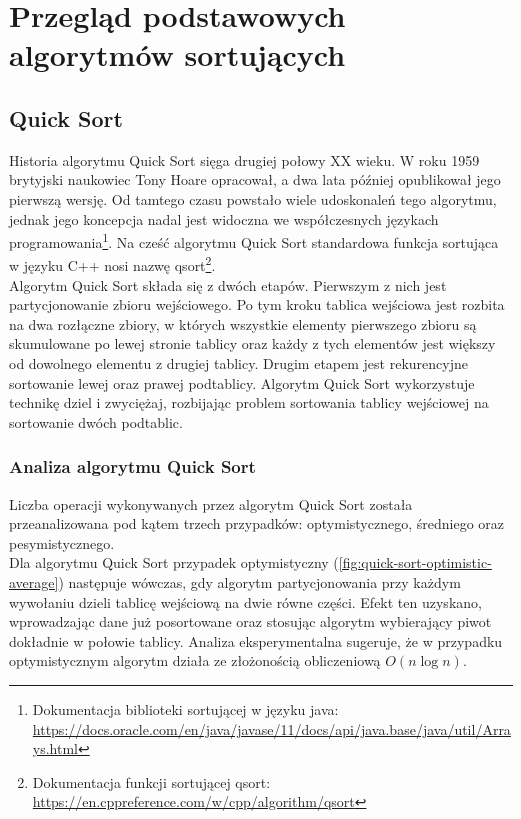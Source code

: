 \chapter{Przegląd podstawowych algorytmów sortujących}
\thispagestyle{chapterBeginStyle}


\section{Quick Sort}


Historia algorytmu Quick Sort sięga drugiej połowy XX wieku. W roku 1959 brytyjski naukowiec Tony Hoare
opracował, a dwa lata później opublikował jego pierwszą wersję. Od tamtego czasu powstało wiele
udoskonaleń tego algorytmu, jednak jego koncepcja nadal jest widoczna we współczesnych językach programowania\footnote{Dokumentacja biblioteki sortującej w języku java: \url{https://docs.oracle.com/en/java/javase/11/docs/api/java.base/java/util/Arrays.html}}.
Na cześć algorytmu Quick Sort standardowa funkcja sortująca w języku C++ nosi nazwę qsort\footnote{Dokumentacja funkcji sortującej qsort:
\url{https://en.cppreference.com/w/cpp/algorithm/qsort}}.\\

Algorytm Quick Sort składa się z dwóch etapów. Pierwszym z nich jest partycjonowanie zbioru wejściowego.
Po tym kroku tablica wejściowa jest rozbita na dwa rozłączne zbiory, w których wszystkie elementy pierwszego
zbioru są skumulowane po lewej stronie tablicy oraz każdy z tych elementów jest większy od dowolnego elementu
z drugiej tablicy. Drugim etapem jest rekurencyjne sortowanie lewej oraz prawej podtablicy.
Algorytm Quick Sort wykorzystuje technikę dziel i zwyciężaj, rozbijając problem sortowania tablicy wejściowej na sortowanie dwóch podtablic.


\subsection{Analiza algorytmu Quick Sort}

Liczba operacji wykonywanych przez algorytm Quick Sort została przeanalizowana pod kątem trzech przypadków:
optymistycznego, średniego oraz pesymistycznego.\\

Dla algorytmu Quick Sort przypadek optymistyczny (\ref{fig:quick-sort-optimistic-average}) następuje wówczas, gdy algorytm partycjonowania przy każdym wywołaniu dzieli tablicę wejściową na dwie równe części. Efekt ten uzyskano, wprowadzając dane już posortowane oraz stosując algorytm wybierający piwot dokładnie w połowie tablicy. Analiza eksperymentalna sugeruje, że w przypadku optymistycznym algorytm działa ze złożonością obliczeniową $O(n\log{}n)$.\\

